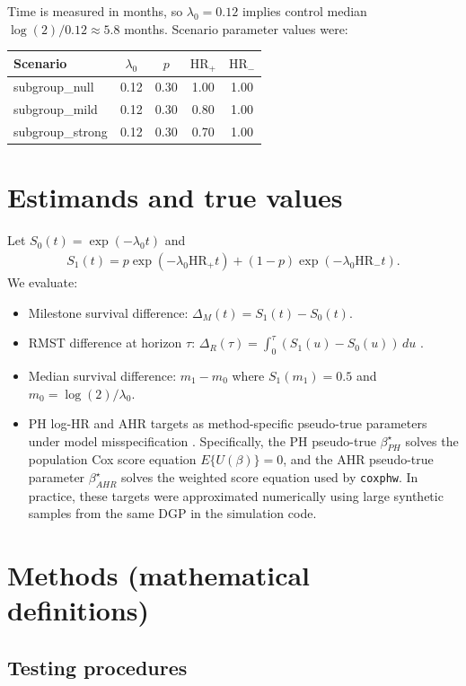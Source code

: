 \documentclass[11pt]{article}
\begin{document}
Time is measured in months, so $\lambda_0=0.12$ implies control median $\log(2)/0.12\approx5.8$ months. Scenario parameter values were:
\begin{center}
\begin{tabular}{lcccc}
\toprule
Scenario & $\lambda_0$ & $p$ & $\mathrm{HR}_{+}$ & $\mathrm{HR}_{-}$ \\
\midrule
subgroup\_null & 0.12 & 0.30 & 1.00 & 1.00 \\
subgroup\_mild & 0.12 & 0.30 & 0.80 & 1.00 \\
subgroup\_strong & 0.12 & 0.30 & 0.70 & 1.00 \\
\bottomrule
\end{tabular}
\end{center}

\section{Estimands and true values}
Let $S_0(t)=\exp(-\lambda_0 t)$ and
\begin{align}
S_1(t)=p\exp(-\lambda_0\mathrm{HR}_{+}t)+(1-p)\exp(-\lambda_0\mathrm{HR}_{-}t).
\end{align}
We evaluate:
\begin{itemize}
\item Milestone survival difference: $\Delta_{M}(t)=S_1(t)-S_0(t)$.
\item RMST difference at horizon $\tau$: $\Delta_{R}(\tau)=\int_0^{\tau}(S_1(u)-S_0(u))\,du$ \citep{uno2014}.
\item Median survival difference: $m_1-m_0$ where $S_1(m_1)=0.5$ and $m_0=\log(2)/\lambda_0$.
\item PH log-HR and AHR targets as method-specific pseudo-true parameters under model misspecification \citep{cox1972,schemper2009}. Specifically, the PH pseudo-true $\beta^{\star}_{PH}$ solves the population Cox score equation $E\{U(\beta)\}=0$, and the AHR pseudo-true parameter $\beta^{\star}_{AHR}$ solves the weighted score equation used by \texttt{coxphw}. In practice, these targets were approximated numerically using large synthetic samples from the same DGP in the simulation code.
\end{itemize}

\section{Methods (mathematical definitions)}
\subsection{Testing procedures}
\end{document}
